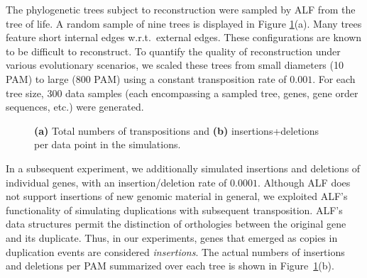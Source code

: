 \documentclass[9pt,english,utf8]{article}
\begin{document}
\medskip
The phylogenetic trees subject to reconstruction were sampled by ALF from the
tree of life. A random sample of nine trees is displayed in Figure
\ref{fig:mutations}(a). Many trees feature short internal edges
w.r.t.~external edges.  These configurations are known to be difficult to
reconstruct. To quantify the quality of reconstruction under various
evolutionary scenarios, we scaled these trees from small diameters (10 PAM) to
large (800 PAM) using a constant transposition rate of $0.001$. For each tree
size, 300 data samples (each encompassing a sampled tree, genes, gene order
sequences, etc.) were generated. 

\begin{figure}[tb]
    \caption{\textbf{(a)} Total numbers of transpositions and \textbf{(b)}
    insertions+deletions per data point in the simulations.}
    \label{fig:mutations}
\end{figure}

In a subsequent experiment, we additionally simulated insertions and deletions
of individual genes, with an insertion/deletion rate of $0.0001$. Although ALF
does not support insertions of new genomic material in general, we exploited
ALF's functionality of simulating duplications with subsequent transposition.
ALF's data structures permit the distinction of orthologies between the
original gene and its duplicate. Thus, in our experiments, genes that emerged
as copies in duplication events are considered \emph{insertions}. The actual
numbers of insertions and deletions per PAM summarized over each tree is shown
in Figure~\ref{fig:mutations}(b).
\end{document}
